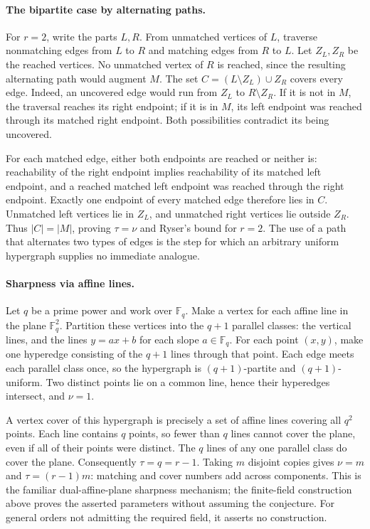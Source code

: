 \documentclass[11pt,a4paper]{article}
\begin{document}
\paragraph{The bipartite case by alternating paths.}
For $r=2$, write the parts $L,R$. From unmatched vertices of $L$, traverse
nonmatching edges from $L$ to $R$ and matching edges from $R$ to $L$.
Let $Z_L,Z_R$ be the reached vertices. No unmatched vertex of $R$ is
reached, since the resulting alternating path would augment $M$.
The set $C=(L\setminus Z_L)\cup Z_R$ covers every edge. Indeed, an
uncovered edge would run from $Z_L$ to $R\setminus Z_R$. If it is not
in $M$, the traversal reaches its right endpoint; if it is in $M$, its
left endpoint was reached through its matched right endpoint. Both
possibilities contradict its being uncovered.

For each matched edge, either both endpoints are reached or neither
is: reachability of the right endpoint implies reachability of its
matched left endpoint, and a reached matched left endpoint was reached
through the right endpoint. Exactly one endpoint of every matched edge
therefore lies in $C$. Unmatched left vertices lie in $Z_L$, and
unmatched right vertices lie outside $Z_R$. Thus $|C|=|M|$, proving
$\tau=\nu$ and Ryser's bound for $r=2$. The use of a path that alternates
two types of edges is the step for which an arbitrary uniform
hypergraph supplies no immediate analogue.

\paragraph{Sharpness via affine lines.}
Let $q$ be a prime power and work over $\mathbb F_q$. Make a vertex for
each affine line in the plane $\mathbb F_q^2$. Partition these vertices
into the $q+1$ parallel classes: the vertical lines, and the lines
$y=ax+b$ for each slope $a\in\mathbb F_q$. For each point $(x,y)$, make
one hyperedge consisting of the $q+1$ lines through that point. Each
edge meets each parallel class once, so the hypergraph is
$(q+1)$-partite and $(q+1)$-uniform. Two distinct points lie on a common
line, hence their hyperedges intersect, and $\nu=1$.

A vertex cover of this hypergraph is precisely a set of affine lines
covering all $q^2$ points. Each line contains $q$ points, so fewer than
$q$ lines cannot cover the plane, even if all of their points were
distinct. The $q$ lines of any one parallel class do cover the plane.
Consequently $\tau=q=r-1$. Taking $m$ disjoint copies gives
$\nu=m$ and $\tau=(r-1)m$: matching and cover numbers add across
components. This is the familiar dual-affine-plane sharpness mechanism;
the finite-field construction above proves the asserted parameters
without assuming the conjecture. For general orders not admitting the
required field, it asserts no construction.
\end{document}
